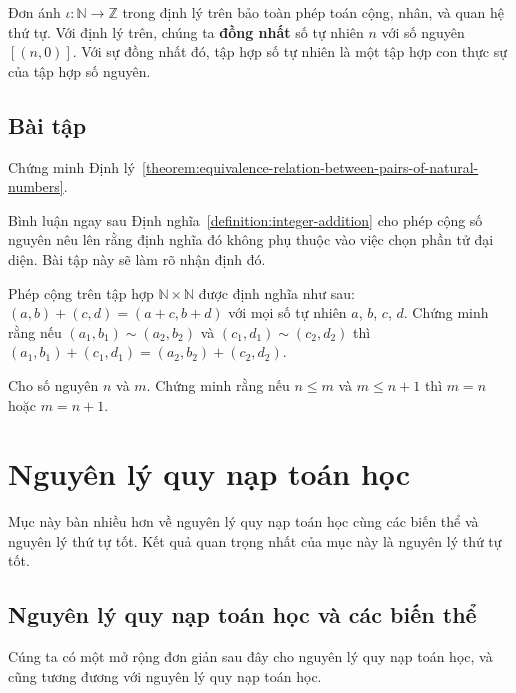 Đơn ánh $\iota: \mathbb{N}\to \mathbb{Z}$ trong định lý trên bảo toàn phép toán cộng, nhân, và quan hệ thứ tự. Với định lý trên, chúng ta \textbf{đồng nhất} số tự nhiên $n$ với số nguyên $[(n, 0)]$. Với sự đồng nhất đó, tập hợp số tự nhiên là một tập hợp con thực sự của tập hợp số nguyên.

\subsection{Bài tập}

\begin{exercise}
    Chứng minh Định lý~\ref{theorem:equivalence-relation-between-pairs-of-natural-numbers}.
\end{exercise}

\begin{exercise}
    Bình luận ngay sau Định nghĩa~\ref{definition:integer-addition} cho phép cộng số nguyên nêu lên rằng định nghĩa đó không phụ thuộc vào việc chọn phần tử đại diện. Bài tập này sẽ làm rõ nhận định đó.

    Phép cộng trên tập hợp $\mathbb{N}\times\mathbb{N}$ được định nghĩa như sau: $(a, b) + (c, d) = (a+c, b+d)$ với mọi số tự nhiên $a$, $b$, $c$, $d$. Chứng minh rằng nếu $(a_{1}, b_{1})\sim (a_{2}, b_{2})$ và  $(c_{1}, d_{1})\sim (c_{2}, d_{2})$ thì $(a_{1}, b_{1}) + (c_{1}, d_{1}) = (a_{2}, b_{2}) + (c_{2}, d_{2})$.
\end{exercise}

\begin{exercise}
    Cho số nguyên $n$ và $m$. Chứng minh rằng nếu $n\leq m$ và $m\leq n+1$ thì $m = n$ hoặc $m = n+1$.
\end{exercise}

\section{Nguyên lý quy nạp toán học}

Mục này bàn nhiều hơn về nguyên lý quy nạp toán học cùng các biến thể và nguyên lý thứ tự tốt. Kết quả quan trọng nhất của mục này là nguyên lý thứ tự tốt.

\subsection{Nguyên lý quy nạp toán học và các biến thể}

Cúng ta có một mở rộng đơn giản sau đây cho nguyên lý quy nạp toán học, và cũng tương đương với nguyên lý quy nạp toán học.


